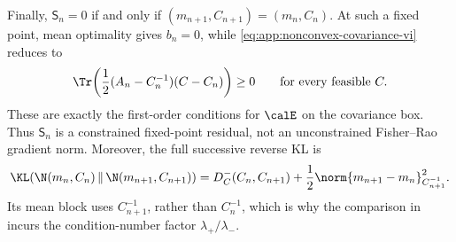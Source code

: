 Finally, \(\mathsf S_n=0\) if and only if
\((m_{n+1},C_{n+1})=(m_n,C_n)\).  At such a fixed point, mean optimality gives
\(b_n=0\), while \eqref{eq:app:nonconvex-covariance-vi} reduces to
\[
  \Tr\!\left(
    \frac12(A_n-C_n^{-1})(C-C_n)
  \right)\geq0
  \qquad\text{for every feasible }C.
\]
These are exactly the first-order conditions for \(\calE\) on the covariance
box.  Thus \(\mathsf S_n\) is a constrained fixed-point residual, not an
unconstrained Fisher--Rao gradient norm.  Moreover, the full successive
reverse KL is
\[
  \KL\!\left(
    \N(m_n,C_n)\,\middle\|\,\N(m_{n+1},C_{n+1})
  \right)
  =D_C^-(C_n,C_{n+1})
   +\frac12\norm{m_{n+1}-m_n}_{C_{n+1}^{-1}}^2.
\]
Its mean block uses \(C_{n+1}^{-1}\), rather than \(C_n^{-1}\), which is why
the comparison in  incurs the condition-number
factor \(\lambda_+/\lambda_-\).
